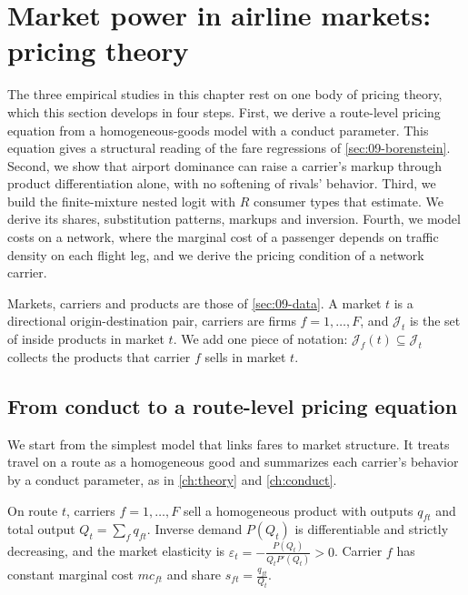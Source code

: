 \section{Market power in airline markets: pricing theory}\label{sec:09-pricing}

The three empirical studies in this chapter rest on one body of pricing theory, which this section
develops in four steps. First, we derive a route-level pricing equation from a homogeneous-goods model
with a conduct parameter. This equation gives a structural reading of the fare regressions of
\cref{sec:09-borenstein}. Second, we show that airport dominance can raise a carrier's markup through
product differentiation alone, with no softening of rivals' behavior. Third, we build the finite-mixture
nested logit with $R$ consumer types that \citet{BerryCarnallSpiller2006} estimate. We derive its
shares, substitution patterns, markups and inversion. Fourth, we model costs on a network, where the
marginal cost of a passenger depends on traffic density on each flight leg, and we derive the pricing
condition of a network carrier.

Markets, carriers and products are those of \cref{sec:09-data}. A market $t$ is a directional
origin-destination pair, carriers are firms $f=1,\dots,F$, and $\mathcal{J}_t$ is the set of inside
products in market $t$. We add one piece of notation: $\mathcal{J}_f(t)\subseteq\mathcal{J}_t$ collects
the products that carrier $f$ sells in market $t$.

\subsection{From conduct to a route-level pricing equation}\label{sec:09-pricing-conduct}

We start from the simplest model that links fares to market structure. It treats travel on a route as a
homogeneous good and summarizes each carrier's behavior by a conduct parameter, as in \cref{ch:theory}
and \cref{ch:conduct}.

\begin{assumption}\label{ass:09-homog}
On route $t$, carriers $f=1,\dots,F$ sell a homogeneous product with outputs $q_{ft}$ and total output
$Q_t=\sum_f q_{ft}$. Inverse demand $P(Q_t)$ is differentiable and strictly decreasing, and the market
elasticity is $\varepsilon_t=-\frac{P(Q_t)}{Q_tP'(Q_t)}>0$. Carrier $f$ has constant marginal cost
$mc_{ft}$ and share $s_{ft}=\frac{q_{ft}}{Q_t}$.
\end{assumption}

